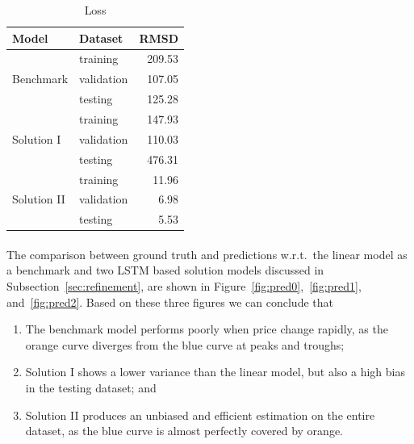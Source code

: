 \documentclass[12pt, letterpaper]{article}
\begin{document}
\begin{table}
    \centering
    \begin{tabular}{llr}
        \toprule
        Model       & Dataset    &   RMSD \\
        \midrule
                    & training   & 209.53 \\
        Benchmark   & validation & 107.05 \\
                    & testing    & 125.28 \\
        \midrule
                    & training   & 147.93 \\
        Solution I  & validation & 110.03 \\
                    & testing    & 476.31 \\
        \midrule
                    & training   &  11.96 \\
        Solution II & validation &   6.98 \\
                    & testing    &   5.53 \\
        \bottomrule
    \end{tabular}
    \caption{Loss}%
    \label{table:loss}
\end{table}

\paragraph{}
The comparison between ground truth and predictions w.r.t.\ the linear model as a benchmark and two LSTM based solution models discussed in Subsection~\ref{sec:refinement}, are shown in Figure~\ref{fig:pred0},\ \ref{fig:pred1}, and\ \ref{fig:pred2}. Based on these three figures we can conclude that

\begin{enumerate}
    \item The benchmark model performs poorly when price change rapidly, as the orange curve diverges from the blue curve at peaks and troughs;
    \item Solution I shows a lower variance than the linear model, but also a high bias in the testing dataset; and
    \item Solution II produces an unbiased and efficient estimation on the entire dataset, as the blue curve is almost perfectly covered by orange.
\end{enumerate}
\end{document}
